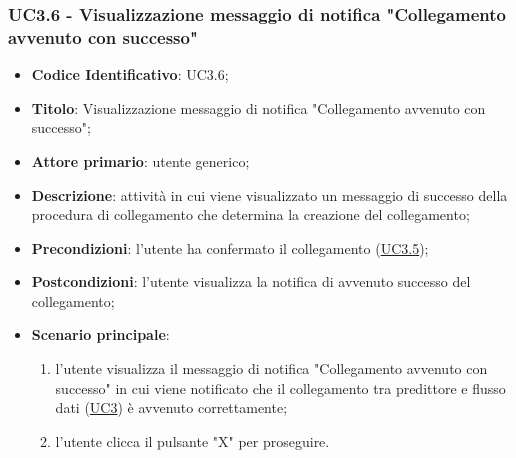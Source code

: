 	\label{par:UC3.6}
	\subsubsection{UC3.6 - Visualizzazione messaggio di notifica "Collegamento avvenuto con successo"}
		\begin{itemize}
			\item\textbf{Codice Identificativo}: UC3.6;
			\item\textbf{Titolo}: Visualizzazione messaggio di notifica "Collegamento avvenuto con successo";
			\item\textbf{Attore primario}: utente generico;
			\item\textbf{Descrizione}: attività in cui viene visualizzato un messaggio di successo della procedura di collegamento che determina la creazione del collegamento;
			\item\textbf{Precondizioni}: l'utente ha confermato il collegamento (\hyperref[par:UC3.5]{UC3.5});
			\item\textbf{Postcondizioni}: l'utente visualizza la notifica di avvenuto successo del collegamento;
			\item\textbf{Scenario principale}:
				\begin{enumerate}
					\item l'utente visualizza il messaggio di notifica "Collegamento avvenuto con successo" in cui viene notificato che il collegamento tra predittore e flusso dati (\hyperref[par:UC3]{UC3}) è avvenuto correttamente;
					\item l'utente clicca il pulsante "X" per proseguire.		
				\end{enumerate}		
		\end{itemize}
		

	\label{par:UC4}
